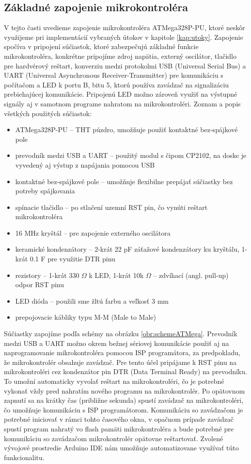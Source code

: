 \subsection{Základné zapojenie mikrokontroléra}
V tejto časti uvedieme zapojenie mikrokontroléra ATMega328P-PU, ktoré neskôr využijeme pri implementácií vybraných útokov v kapitole \ref{kap:utoky}. Zapojenie spočíva v pripojení súčiastok, ktoré zabezpečujú základné funkcie mikrokontroléra, konkrétne pripojíme zdroj napätia, externý oscilátor, tlačidlo pre hardvérový reštart, konverziu medzi protokolmi USB (Universal Serial Bus) a UART (Universal Asynchronous Receiver-Transmitter) pre komunikáciu s počítačom a LED k portu B, bitu 5, ktorú používa zavádzač na signalizáciu prebiehajúcej komunikácie. Pripojenú LED možno zároveň využiť na výstupné signály aj v samotnom programe nahratom na mikrokontroléri. Zoznam a popis všetkých použitých súčiastok:
\begin{itemize}
    \item ATMega328P-PU -- THT púzdro, umožňuje použiť kontaktné bez-spájkové pole
    \item prevodník medzi USB a UART -- použitý modul s čipom CP2102, na doske je vyvedený aj výstup z napájania pomocou USB
    \item kontaktné bez-spájkové pole -- umožňuje flexibilne prepájať súčiastky bez potreby spájkovania
    \item spínacie tlačidlo -- po stlačení uzemní RST pin, čo vynúti reštart mikrokontroléra
    \item 16 MHz kryštál -- pre zapojenie externého oscilátora
    \item keramické kondenzátory -- 2-krát 22 pF záťažové kondenzátory ku kryštálu, 1-krát 0.1 \textmu F pre využitie DTR pinu
    \item rezistory -- 1-krát 330 $\Omega$ k LED, 1-krát 10k $\Omega$ -- zdvíhací (angl. pull-up) odpor RST pinu
    \item LED dióda -- použili sme žltú farbu a veľkosť 3 mm
    \item prepojovacie kábliky typu M-M (Male to Male)
\end{itemize}
Súčiastky zapojíme podľa schémy na obrázku \ref{obr:schemeATMega}. Prevodník medzi USB a UART možno okrem bežnej sériovej komunikácie použiť aj na naprogramovanie mikrokontroléra pomocou ISP programátora, za predpokladu, že mikrokontrolér obsahuje zavádzač. Pre tento účel pripájame k RST pinu na mikrokontroléri cez kondenzátor pin DTR (Data Terminal Ready) na prevodníku. To umožní automaticky vyvolať reštart na mikrokontroléri, čo je potrebné vykonať vždy pred nahratím nového programu na mikrokontrolér. Po opätovnom zapnutí sa na krátky čas (približne sekunda) spustí zavádzač na mikrokontroléri, čo umožňuje komunikáciu s ISP programátorom. Komunikáciu so zavádzačom je potrebné iniciovať v rámci tohto časového okna, v opačnom prípade zavádzač spustí program nahratý vo flash pamäti mikrokontroléra a bude potrebné pre komunikáciu so zavádzačom mikrokontrolér opätovne reštartovať. Zvolené vývojové prostredie Arduino IDE nám umožňuje automatizovane využívať túto funkcionalitu.

